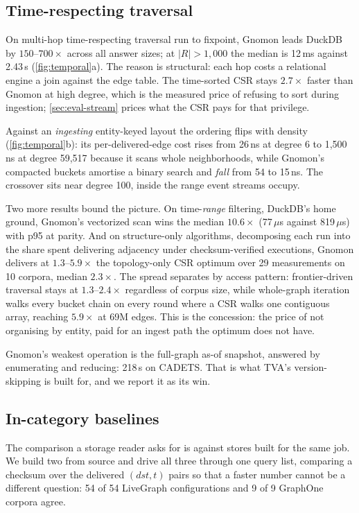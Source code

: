\documentclass[letterpaper,twocolumn,10pt]{article}
\newcommand{\sys}{Gnomon\xspace}
\begin{document}
\subsection{Time-respecting traversal}
\label{sec:eval-traversal}
On multi-hop time-respecting traversal run to fixpoint, \sys leads
DuckDB by $150$--$700\times$ across all answer sizes; at $|R|>1{,}000$
the median is 12\,ms against 2.43\,s (\cref{fig:temporal}a). The
reason is structural: each hop costs a relational engine a join
against the edge table. The time-sorted CSR stays $2.7\times$ faster
than \sys at high degree, which is the measured price of refusing to
sort during ingestion; \cref{sec:eval-stream} prices what the CSR pays
for that privilege.

Against an \emph{ingesting} entity-keyed layout the ordering flips with
density (\cref{fig:temporal}b): its per-delivered-edge cost rises from
26\,ns at degree 6 to 1{,}500\,ns at degree 59{,}517 because it scans
whole neighborhoods, while \sys's compacted buckets amortise a binary
search and \emph{fall} from 54 to 15\,ns. The crossover sits near
degree 100, inside the range event streams occupy.

Two more results bound the picture. On time-\emph{range} filtering,
DuckDB's home ground, \sys's vectorized scan wins the median
$10.6\times$ (77\,$\mu$s against 819\,$\mu$s) with p95 at parity. And on
structure-only algorithms, decomposing each run into the share spent
delivering adjacency under checksum-verified executions, \sys delivers
at $1.3$--$5.9\times$ the topology-only CSR optimum over 29 measurements
on 10 corpora, median $2.3\times$. The spread separates by access
pattern: frontier-driven traversal stays at $1.3$--$2.4\times$
regardless of corpus size, while whole-graph iteration walks every
bucket chain on every round where a CSR walks one contiguous array,
reaching $5.9\times$ at 69M edges. This is the concession: the price of
not organising by entity, paid for an ingest path the optimum does not
have.

\sys's weakest operation is the full-graph as-of snapshot, answered by
enumerating and reducing: 218\,s on CADETS. That is what TVA's
version-skipping is built for, and we report it as its win.


\subsection{In-category baselines}
\label{sec:eval-baselines}
The comparison a storage reader asks for is against stores built for
the same job. We build two from source and drive all three through one
query list, comparing a checksum over the delivered
$(\mathit{dst}, t)$ pairs so that a faster number cannot be a
different question: 54 of 54 LiveGraph configurations and 9 of 9
GraphOne corpora agree.
\end{document}
